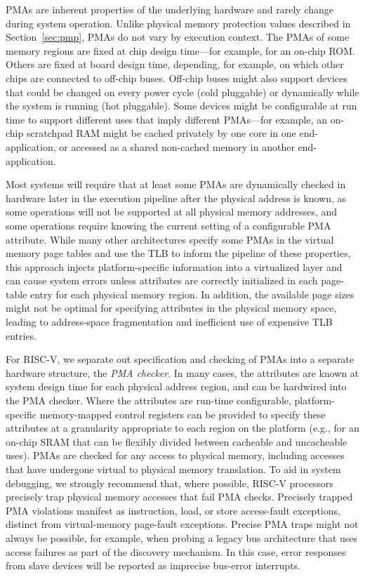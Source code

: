 PMAs are inherent properties of the underlying hardware and rarely
change during system operation.  Unlike physical memory protection
values described in Section~\ref{sec:pmp}, PMAs do not vary by
execution context.  The PMAs of some memory regions are fixed at chip
design time---for example, for an on-chip ROM.  Others are fixed at
board design time, depending, for example, on which other chips are
connected to off-chip buses.  Off-chip buses might also support
devices that could be changed on every power cycle (cold pluggable) or
dynamically while the system is running (hot pluggable).  Some devices
might be configurable at run time to support different uses that imply
different PMAs---for example, an on-chip scratchpad RAM might be
cached privately by one core in one end-application, or accessed as a
shared non-cached memory in another end-application.

Most systems will require that at least some PMAs are dynamically
checked in hardware later in the execution pipeline after the physical
address is known, as some operations will not be supported at all
physical memory addresses, and some operations require knowing the
current setting of a configurable PMA attribute.  While many other architectures
specify some PMAs in the virtual memory page tables and use the TLB to
inform the pipeline of these properties, this approach injects platform-specific
information into a virtualized layer and can cause system errors
unless attributes are correctly initialized in each page-table entry
for each physical memory region.  In addition, the available
page sizes might not be optimal for specifying attributes in the
physical memory space, leading to address-space fragmentation and
inefficient use of expensive TLB entries.

For RISC-V, we separate out specification and checking of PMAs into a
separate hardware structure, the {\em PMA checker}.  In many cases,
the attributes are known at system design time for each physical
address region, and can be hardwired into the PMA checker.  Where the
attributes are run-time configurable, platform-specific memory-mapped
control registers can be provided to specify these attributes at a
granularity appropriate to each region on the platform (e.g., for an
on-chip SRAM that can be flexibly divided between cacheable and
uncacheable uses).  PMAs are checked for any access to physical
memory, including accesses that have undergone virtual to physical
memory translation.  To aid in system debugging, we strongly recommend
that, where possible, RISC-V processors precisely trap physical memory
accesses that fail PMA checks.  Precisely trapped PMA violations manifest
as instruction, load, or store access-fault exceptions, distinct from
virtual-memory page-fault exceptions. Precise PMA traps might not always be
possible, for example, when probing a legacy bus architecture that
uses access failures as part of the discovery mechanism.  In this
case, error responses from slave devices will be reported as imprecise
bus-error interrupts.

